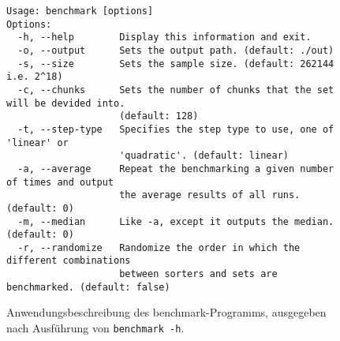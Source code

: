 \begin{figure}[hbp]
    \begin{lstlisting}[style=inline]
Usage: benchmark [options]
Options:
  -h, --help        Display this information and exit.
  -o, --output      Sets the output path. (default: ./out)
  -s, --size        Sets the sample size. (default: 262144 i.e. 2^18)
  -c, --chunks      Sets the number of chunks that the set will be devided into.
                    (default: 128)
  -t, --step-type   Specifies the step type to use, one of 'linear' or
                    'quadratic'. (default: linear)
  -a, --average     Repeat the benchmarking a given number of times and output
                    the average results of all runs. (default: 0)
  -m, --median      Like -a, except it outputs the median. (default: 0)
  -r, --randomize   Randomize the order in which the different combinations
                    between sorters and sets are benchmarked. (default: false)
    \end{lstlisting}
    \caption{Anwendungsbeschreibung des benchmark-Programms, ausgegeben nach Ausführung von \lstinline{benchmark -h}.}
    \label{fig:benchmark-usage}
\end{figure}





